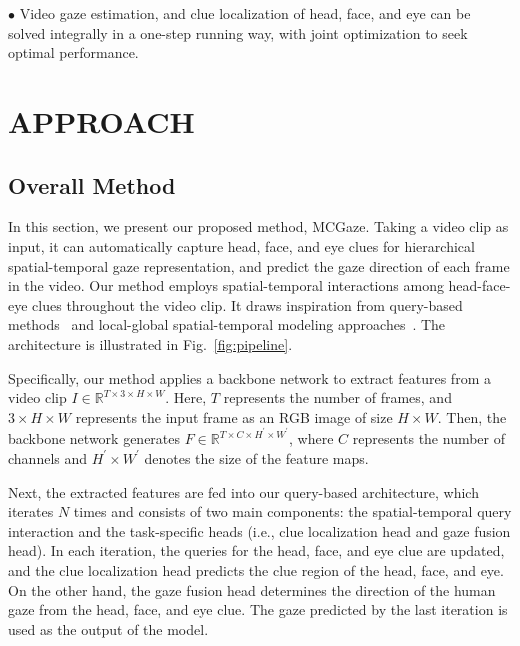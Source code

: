 \documentclass[journal]{IEEEtran}
\begin{document}
$\bullet$ Video gaze estimation, and clue localization of head, face, and eye can be solved integrally in a one-step running way, with joint optimization to seek optimal performance.



\section{APPROACH}




\subsection{Overall Method}  
 In this section, we present our proposed method, MCGaze. Taking a video clip as input, it can automatically capture head, face, and eye clues for hierarchical spatial-temporal gaze representation, and predict the gaze direction of each frame in the video. 
Our method employs spatial-temporal interactions among head-face-eye clues throughout the video clip.  It draws inspiration from query-based methods~\cite{sparse,Tevit,instblink,garg2023multiscaled,spl_query_specific,2023query_video} and local-global spatial-temporal modeling approaches~\cite{local2023,local2020,liang2023local,cycmunet2023}.  
The architecture is illustrated in Fig.~\ref{fig:pipeline}.
 
Specifically, our method applies a backbone network to extract features from a video clip $I\in \mathbb{R}^{T\times 3 \times H \times W}$. Here, $T$ represents the number of frames, and $3 \times H \times W$ represents the input frame as an RGB image of size $H \times W$. Then, the backbone network generates $F \in \mathbb{R}^{T\times C \times H^{'} \times W^{'}}$, where $C$ represents the number of channels and $H^{'}\times W^{'}$ denotes the size of the feature maps.


Next, the extracted features are fed into our query-based architecture, which iterates $N$ times and consists of two main components: the spatial-temporal query interaction and the task-specific heads (i.e., clue localization head and gaze fusion head). In each iteration, the queries for the head, face, and eye clue are updated, and the clue localization head predicts the clue region of the head, face, and eye. On the other hand, the gaze fusion head determines the direction of the human gaze from the head, face, and eye clue. The gaze predicted by the last iteration is used as the output of the model.
\end{document}
